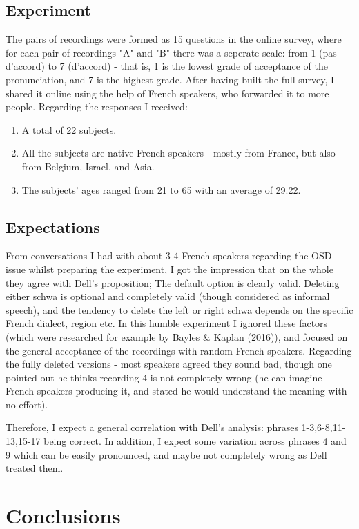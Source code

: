 \documentclass{article}
\begin{document}
\subsection{Experiment}
The pairs of recordings were formed as 15 questions in the online survey, where for each pair of recordings "A" and "B" there was a seperate scale: from 1 (pas d'accord) to 7 (d'accord) - that is, 1 is the lowest grade of acceptance of the pronunciation, and 7 is the highest grade. After having built the full survey,  I shared it online using the help of French speakers, who forwarded it to more people.  
Regarding the responses I received:
\begin{enumerate}
  \item A total of 22 subjects.
  \item All the subjects are native French speakers - mostly from France, but also from Belgium, Israel,  and Asia.
  \item The subjects’ ages ranged from 21 to 65 with an average of 29.22.
\end{enumerate}

\subsection{Expectations}
From conversations I had with about 3-4 French speakers regarding the OSD issue whilst preparing the experiment,  I got the impression that on the whole they agree with Dell's proposition; The default option is clearly valid. Deleting either schwa is optional and completely valid (though considered as informal speech), and the tendency to delete the left or right schwa depends on the specific French dialect, region etc. In this humble experiment I ignored these factors (which were researched for example by Bayles \& Kaplan (2016)), and focused on the general acceptance of the recordings with random French speakers. 
Regarding the fully deleted versions - most speakers agreed they sound bad, though one pointed out he thinks recording 4 is not completely wrong (he can imagine French speakers producing it, and stated he would understand the meaning with no effort). 

Therefore, I expect a general correlation with Dell's analysis: phrases 1-3,6-8,11-13,15-17 being correct. In addition, I expect some variation across phrases 4 and 9 which can be easily pronounced, and maybe not completely wrong as Dell treated them. 

\clearpage
\section{Conclusions} %
\end{document}
